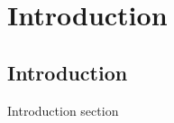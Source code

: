 \chapter[Introduction]{Introduction}
\label{Chap:Intro}

\section{Introduction}

Introduction section